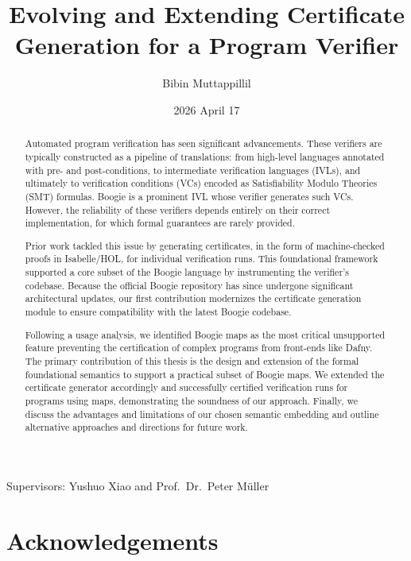 \documentclass[11pt]{article}
\title{Evolving and Extending Certificate Generation for a Program Verifier}
\author{Bibin Muttappillil}
\date{2026 April 17}
\begin{document}
\maketitle

\begin{center}
Supervisors: Yushuo Xiao and Prof.~Dr.~Peter M\"uller
\end{center}

\begin{abstract}
Automated program verification has seen significant advancements. 
These verifiers are typically constructed as a pipeline of translations: from high-level languages 
annotated with pre- and post-conditions, to intermediate verification languages (IVLs), 
and ultimately to verification conditions (VCs) encoded as Satisfiability Modulo Theories (SMT) formulas. 
Boogie is a prominent IVL whose verifier generates such VCs. However, the reliability of these 
verifiers depends entirely on their correct implementation, for which formal guarantees are rarely provided.

Prior work tackled this issue by generating certificates,
in the form of machine-checked proofs in Isabelle/HOL,
for individual verification runs.
This foundational framework supported a core 
subset of the Boogie language by instrumenting the verifier's codebase. Because the official Boogie 
repository has since undergone significant architectural updates, our first contribution modernizes 
the certificate generation module to ensure compatibility with the latest Boogie codebase.

Following a usage analysis, we identified Boogie maps as the most critical unsupported feature 
preventing the certification of complex programs from front-ends like Dafny. The primary contribution 
of this thesis is the design and extension of the formal foundational semantics to support a 
practical subset of Boogie maps. We extended the certificate generator accordingly and successfully 
certified verification runs for programs using maps, demonstrating the soundness of our approach. 
Finally, we discuss the advantages and limitations of our chosen semantic embedding and outline 
alternative approaches and directions for future work.
\end{abstract}

\pagebreak

\section*{Acknowledgements}
\end{document}
